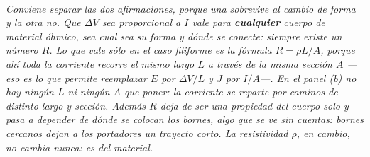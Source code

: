 \begin{center}
\\[0.5em]
{\small\itshape Conviene separar las dos afirmaciones, porque una sobrevive al
cambio de forma y la otra no. Que $\Delta V$ sea proporcional a $I$ vale para
\textbf{cualquier} cuerpo de material óhmico, sea cual sea su forma y dónde se
conecte: siempre existe un número $R$. Lo que vale sólo en el caso filiforme es
la fórmula $R = \rho L/A$, porque ahí toda la corriente recorre el mismo largo
$L$ a través de la misma sección $A$ ---eso es lo que permite reemplazar $E$ por
$\Delta V/L$ y $J$ por $I/A$---. En el panel (b) no hay ningún $L$ ni ningún $A$
que poner: la corriente se reparte por caminos de distinto largo y sección.
Además $R$ deja de ser una propiedad del cuerpo solo y pasa a depender de dónde
se colocan los bornes, algo que se ve sin cuentas: bornes cercanos dejan a los
portadores un trayecto corto. La resistividad $\rho$, en cambio, no cambia
nunca: es del material.}
\end{center}
